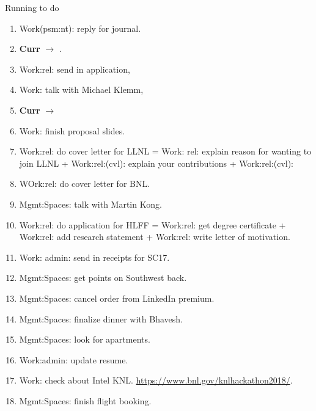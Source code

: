
\begin{frame}{Running to do}
\begin{enumerate} 
\item \tiny Work(psm:nt): reply for journal. 
  \tiny \item[] \tiny \textbf{Curr} $\rightarrow$ 
. 
\item Work:rel: send in application,
\item \tiny Work: talk with Michael Klemm, 
\item \tiny {\bf Curr} $\rightarrow$ 

\item \tiny Work: finish proposal slides.  

\item \tiny Work:rel: do cover letter for LLNL = Work: rel: explain
  reason for wanting to join LLNL + Work:rel:(cvl): explain your
  contributions + Work:rel:(cvl): 

\item \tiny WOrk:rel: do cover letter for BNL. 
\item \tiny Mgmt:Spaces: talk with Martin Kong. 
 
\item \tiny Work:rel: do application for HLFF = Work:rel: get degree
  certificate + Work:rel: add research statement + Work:rel: write
  letter of motivation. 

\item \tiny Work: admin: send in receipts for SC17. 

\item \tiny Mgmt:Spaces: get points on Southwest back.

\item \tiny Mgmt:Spaces: cancel order from LinkedIn premium. 

\item \tiny Mgmt:Spaces: finalize dinner with Bhavesh.

\item \tiny Mgmt:Spaces: look for apartments.

\item \tiny Work:admin: update resume.
\item \tiny Work: check about Intel KNL.  \url{https://www.bnl.gov/knlhackathon2018/}. 
  
\item \tiny Mgmt:Spaces: finish flight booking. 


\end{enumerate}
\end{frame}
